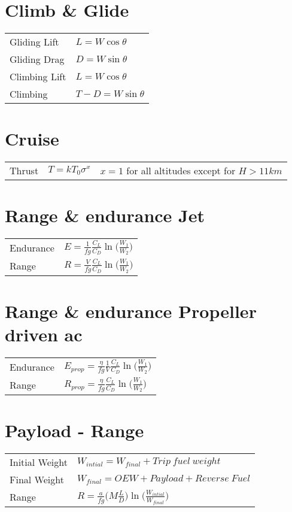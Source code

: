\documentclass[a4paper,9pt]{extarticle}
\begin{document}
\begin{multicols*}{2}
\section{Climb \& Glide}

\begin{tabular}{ll}
Gliding Lift & $L=W\cos \theta$\\
Gliding Drag & $D=W\sin \theta$\\
Climbing Lift & $L=W\cos \theta$\\
Climbing & $T-D=W\sin \theta$
\end{tabular}

\section{Cruise}

\begin{tabular}{lll}
Thrust & $T=kT_0{\sigma}^x$ & $x=1$ for all altitudes except for $H>11km$
\end{tabular}

\section{Range \& endurance Jet}
\begin{tabular}{ll}
Endurance & $E=\frac{1}{fg} \frac{C_L}{C_D}\ln\Big({\frac{W_1}{W_2}}\Big)$\\
Range & $R=\frac{V}{fg} \frac{C_L}{C_D}\ln\Big({\frac{W_1}{W_2}}\Big)$
\end{tabular}

\section{Range \& endurance Propeller driven ac}
\begin{tabular}{ll}
Endurance & $E_{prop}=\frac{\eta}{fg}\frac{1}{V} \frac{C_L}{C_D}\ln\Big({\frac{W_1}{W_2}}\Big)$\\
Range & $R_{prop}=\frac{\eta}{fg} \frac{C_L}{C_D}\ln\Big({\frac{W_1}{W_2}}\Big)$
\end{tabular}
\section{Payload - Range}
\begin{tabular}{ll}
Initial Weight & $W_{intial}=W_{final}+Trip \ fuel\ weight$\\
Final Weight & $W_{final}=OEW+Payload+Reverse\ Fuel$\\
Range & $R=\frac{a}{fg} \Big(M\frac{L}{D}\Big)\ln\Big({\frac{W_{intial}}{W_{final}}}\Big)$
\end{tabular}

\end{multicols*}
\end{document}
